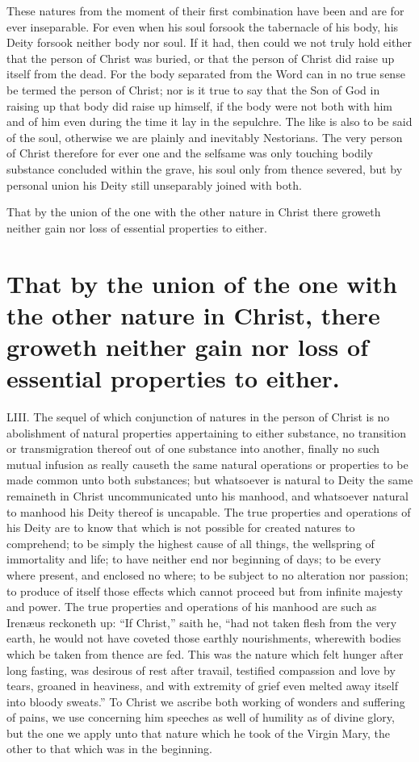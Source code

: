 These natures from the moment of their first combination have been and are for ever inseparable.
 For even when his soul forsook the tabernacle of his body, his Deity forsook neither body nor soul. If it had, then could we not truly hold either that the person of Christ was buried, or that the person of Christ did raise up itself from the dead. For the body separated from the Word can in no true sense be termed the person of Christ; nor is it true to say that the Son of God in raising up that body did raise up himself, if the body were not both with him and of him even during the time it lay in the sepulchre. The like is also to be said of the soul, otherwise we are plainly and inevitably Nestorians. The very person of Christ therefore for ever one and the selfsame was only touching bodily substance concluded within the grave, his soul only from thence severed, but by personal union his Deity still unseparably joined with both.


That by the union of the one with the other nature in Christ there groweth neither gain nor loss of essential properties to either.
\section*{That by the union of the one with the other nature in Christ, there groweth neither gain nor loss of essential properties to either.}
LIII. The sequel of which conjunction of natures in the person of Christ is no abolishment of natural properties appertaining to either substance, no transition or transmigration thereof out of one substance into another, finally no such mutual infusion as really causeth the same natural operations or properties to be made common unto both substances; but whatsoever is natural to Deity the same remaineth in Christ uncommunicated unto his manhood, and whatsoever natural to manhood his Deity thereof is uncapable. The true properties and operations of his Deity are to know that which is not possible for created natures to comprehend; to be simply the highest cause of all things, the wellspring of immortality and life; to have neither end nor beginning of days; to be every where present, and enclosed no where; to be subject to no alteration nor passion; to produce of itself those effects which cannot proceed but from infinite majesty and power. The true properties and operations of his manhood are such as Irenæus reckoneth up: “If Christ,” saith he, “had not taken flesh  from the very earth,
 he would not have coveted those earthly nourishments, wherewith bodies which be taken from thence are fed. This was the nature which felt hunger after long fasting, was desirous of rest after travail, testified compassion and love by tears, groaned in heaviness, and with extremity of grief even melted away itself into bloody sweats.” To Christ we ascribe both working of wonders and suffering of pains, we use concerning him speeches as well of humility as of divine glory, but the one we apply unto that nature which he took of the Virgin Mary, the other to that which was in the beginning.

